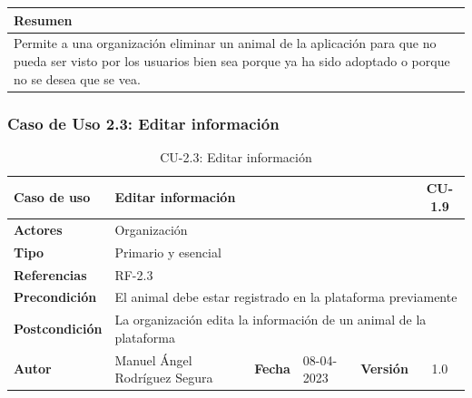 \begin{table}[H]
    \centering
    \begin{tabularx}{\textwidth}{@{} |L |@{}} \hline
        \textbf{Resumen} \\
        \hline
        Permite a una organización eliminar un animal de la aplicación para que no pueda ser visto por los usuarios bien
    sea porque ya ha sido adoptado o porque no se desea que se vea. \\
        \hline
    \end{tabularx}
\end{table}

\subsubsection{Caso de Uso 2.3: Editar información}\label{subsubsec:editar-informacion-animal}

\begin{table}[H]
    \begin{center}
        \begin{adjustbox}{width=\textwidth}
            \begin{tabular}{ | l | l | l | l | c | c | }
                \hline
                \textbf{Caso de uso} & \multicolumn{4}{l|}{Editar información} & \cellcolor{gray!50} \textbf{CU-1.9}\\
                \hline
                \textbf{Actores} & \multicolumn{5}{p{0.5\linewidth}|}{Organización} \\
                \hline
                \textbf{Tipo} & \multicolumn{5}{l|}{Primario y esencial} \\
                \hline
                \textbf{Referencias} & \multicolumn{3}{l|}{RF-2.3} & \multicolumn{2}{l|}{ }\\
                \hline
                \textbf{Precondición} & \multicolumn{5}{l|}{El animal debe estar registrado en la plataforma previamente} \\
                \hline
                \textbf{Postcondición} & \multicolumn{5}{l|}{La organización edita la información de un animal de la plataforma} \\
                \hline
                \textbf{Autor} & \multicolumn{1}{p{0.25\linewidth}|}{Manuel Ángel Rodríguez Segura} & \textbf{Fecha} &
                08-04-2023     & \textbf{Versión}                                                      & 1.0\\
                \hline
            \end{tabular}
        \end{adjustbox}
        \caption{CU-2.3: Editar información}
        \label{tab:editar-animal}
    \end{center}
\end{table}

